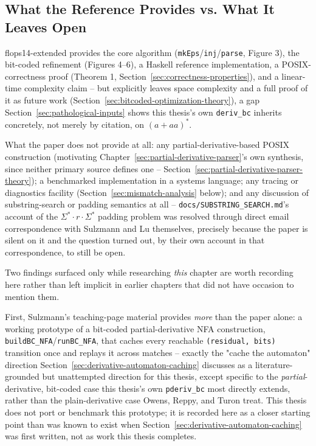 \subsection{What the Reference Provides vs. What It Leaves Open}
\label{sec:reference-scope}

flops14-extended \citep{sulzmannlu2014} provides the core algorithm
(\texttt{mkEps}/\texttt{inj}/\texttt{parse}, Figure 3), the bit-coded
refinement (Figures 4--6), a Haskell reference implementation, a
POSIX-correctness proof (Theorem 1, Section~\ref{sec:correctness-properties}), and a
linear-time complexity claim -- but explicitly leaves space complexity
and a full proof of it as future work
(Section~\ref{sec:bitcoded-optimization-theory}), a gap
Section~\ref{sec:pathological-inputs} shows this thesis's own
\texttt{deriv\_bc} inherits concretely, not merely by citation, on
$(a+aa)^{*}$.

What the paper does not provide at all: any partial-derivative-based
POSIX construction (motivating Chapter~\ref{sec:partial-derivative-parser}'s
own synthesis, since neither primary source defines one --
Section~\ref{sec:partial-derivative-parser-theory}); a benchmarked
implementation in a systems language; any tracing or diagnostics
facility (Section~\ref{sec:mismatch-analysis} below); and any discussion
of substring-search or padding semantics at all --
\texttt{docs/SUBSTRING\_SEARCH.md}'s account of the
$\Sigma^{*} \cdot r \cdot \Sigma^{*}$ padding problem was resolved
through direct email correspondence with Sulzmann and Lu themselves,
precisely because the paper is silent on it and the question turned out,
by their own account in that correspondence, to still be open.

Two findings surfaced only while researching \emph{this} chapter are
worth recording here rather than left implicit in earlier chapters that
did not have occasion to mention them.

First, Sulzmann's teaching-page material provides \emph{more} than the
paper alone: a working prototype of a bit-coded partial-derivative NFA
construction, \texttt{buildBC\_NFA}/\texttt{runBC\_NFA}, that caches
every reachable \texttt{(residual, bits)} transition once and replays it
across matches -- exactly the "cache the automaton" direction
Section~\ref{sec:derivative-automaton-caching} discusses as a
literature-grounded but unattempted direction for this thesis, except
specific to the \emph{partial}-derivative, bit-coded case this thesis's
own \texttt{pderiv\_bc} most directly extends, rather than the
plain-derivative case Owens, Reppy, and Turon treat. This thesis does not
port or benchmark this prototype; it is recorded here as a closer
starting point than was known to exist when
Section~\ref{sec:derivative-automaton-caching} was first written, not as
work this thesis completes.


